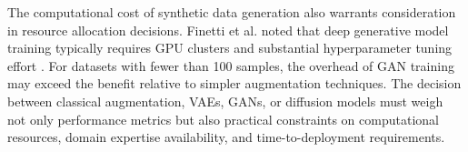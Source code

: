 The computational cost of synthetic data generation also warrants consideration in resource allocation decisions. Finetti et al. noted that deep generative model training typically requires GPU clusters and substantial hyperparameter tuning effort \cite{finetti2025data}. For datasets with fewer than 100 samples, the overhead of GAN training may exceed the benefit relative to simpler augmentation techniques. The decision between classical augmentation, VAEs, GANs, or diffusion models must weigh not only performance metrics but also practical constraints on computational resources, domain expertise availability, and time-to-deployment requirements.
